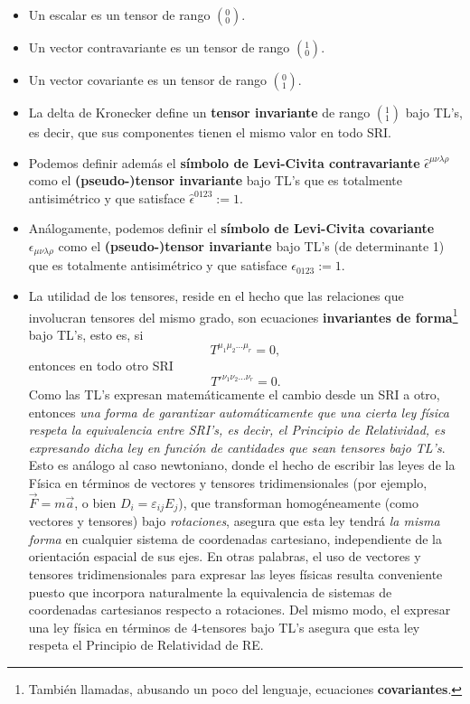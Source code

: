 \begin{itemize}
\item Un escalar es un tensor de rango $(^0_0)$.
\item Un vector contravariante es un tensor de rango $(^1_0)$.
\item Un vector covariante es un tensor de rango $(^0_1)$.
\item La delta de Kronecker define un \textbf{tensor invariante} de rango $(^1_1)$ bajo TL's, es decir, que sus componentes tienen el mismo valor en todo SRI.
\item Podemos definir además el \textbf{símbolo de Levi-Civita contravariante} $\hat\epsilon^{\mu\nu\lambda\rho}$ como el \textbf{(pseudo-)tensor invariante} bajo TL's que es totalmente antisimétrico y que satisface $\hat\epsilon^{0123}:=1$.
\item Análogamente, podemos definir el \textbf{símbolo de Levi-Civita
covariante} $\epsilon_{\mu\nu\lambda\rho}$ como el \textbf{(pseudo-)tensor invariante} bajo TL's (de determinante 1) que es totalmente antisimétrico y
que satisface $\epsilon_{0123}:=1$.

\item La utilidad de los tensores, reside en el hecho que las relaciones que
involucran tensores del mismo grado, son ecuaciones 
\textbf{invariantes de forma}\footnote{También llamadas, abusando un poco del lenguaje, ecuaciones \textbf{covariantes}.} bajo TL's, esto es, si
\begin{equation}
T^{\mu_1 \mu_2 ... \mu_r}=0,
\end{equation}
entonces en todo otro SRI 
\begin{equation}
T'^{\nu_1 \nu_2 ... \nu_r}=0.
\end{equation}
Como las TL's expresan matemáticamente el cambio desde un SRI a otro, entonces \textit{una forma de garantizar automáticamente que una cierta ley física respeta la equivalencia entre SRI's, es decir, el Principio de Relatividad, es expresando dicha ley en función de cantidades que sean tensores bajo TL's}. Esto es análogo al caso newtoniano, donde el hecho de escribir las leyes de la Física en términos de vectores y tensores tridimensionales (por ejemplo,
$\vec{F}=m\vec{a}$, o bien $D_i=\varepsilon_{ij}E_j$), que transforman homogéneamente (como vectores y tensores) bajo \textit{rotaciones}, asegura que esta ley tendrá \textit{la misma forma} en cualquier sistema de coordenadas cartesiano, independiente de la orientación espacial de sus ejes. En otras palabras, el uso de vectores y tensores tridimensionales para expresar las leyes físicas resulta conveniente puesto que incorpora naturalmente la equivalencia de sistemas de coordenadas cartesianos respecto a rotaciones. Del mismo modo, el expresar una ley física en términos de 4-tensores bajo TL's asegura que esta ley respeta el Principio de Relatividad de RE.

\end{itemize}

